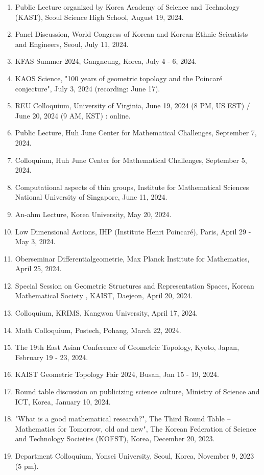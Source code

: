 \documentclass[11pt,a4paper]{article}
\begin{document}
\begin{enumerate}[leftmargin=1.5em, label=\arabic*.]
\item Public Lecture organized by Korea Academy of Science and Technology (KAST), Seoul Science High School, August 19, 2024.
\item Panel Discussion, World Congress of Korean and Korean-Ethnic Scientists and Engineers, Seoul, July 11, 2024.
\item KFAS Summer 2024, Gangneung, Korea, July 4 - 6, 2024.
\item KAOS Science, "100 years of geometric topology and the Poincaré conjecture", July 3, 2024 (recording: June 17).
\item REU Colloquium, University of Virginia, June 19, 2024 (8 PM, US EST) / June 20, 2024 (9 AM, KST) : online.
\item Public Lecture, Huh June Center for Mathematical Challenges, September 7, 2024.
\item Colloquium, Huh June Center for Mathematical Challenges, September 5, 2024.
\item Computational aspects of thin groups, Institute for Mathematical Sciences National University of Singapore, June 11, 2024.
\item An-ahm Lecture, Korea University, May 20, 2024.
\item Low Dimensional Actions, IHP (Institute Henri Poincaré), Paris, April 29 - May 3, 2024.
\item Oberseminar Differentialgeometrie, Max Planck Institute for Mathematics, April 25, 2024.
\item Special Session on Geometric Structures and Representation Spaces, Korean Mathematical Society , KAIST, Daejeon, April 20, 2024.
\item Colloquium, KRIMS, Kangwon University, April 17, 2024.
\item Math Colloquium, Postech, Pohang, March 22, 2024.
\item The 19th East Asian Conference of Geometric Topology, Kyoto, Japan, February 19 - 23, 2024.
\item KAIST Geometric Topology Fair 2024, Busan, Jan 15 - 19, 2024.
\item Round table discussion on publicizing science culture, Ministry of Science and ICT, Korea, January 10, 2024.
\item "What is a good mathematical research?", The Third Round Table -- Mathematics for Tomorrow, old and new", The Korean Federation of Science and Technology Societies (KOFST), Korea, December 20, 2023.
\item Department Colloquium, Yonsei University, Seoul, Korea, November 9, 2023 (5 pm).

\end{enumerate}
\end{document}
